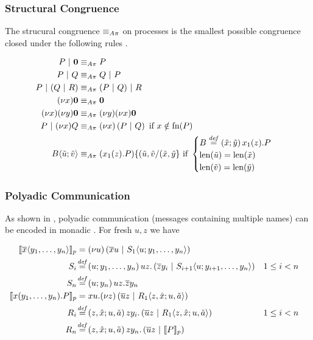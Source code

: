 \vfill

\subsubsection{Structural Congruence}

The strucural congruence $\equiv_{A\pi}$ on processes
is the smallest possible congruence closed under the following rules
\cite{thati_theory_2003}.

\begin{align*}
  P \apar \anullproc
    &\astructequ P \\
  P \apar Q
    &\astructequ Q \apar P \\
  P \apar (Q \apar R)
    &\astructequ (P \apar Q) \apar R \\
  \anew{x}{\anullproc}
    &\astructequ \anullproc \\
  \anew{x}{\anew{y}{\anullproc}}
    &\astructequ \anew{y}{\anew{x}{\anullproc}} \\
  P \apar \anew{x}{Q}
    &\astructequ \anew*{x}{P \apar Q} \text{ if } x \notin \fn{P} \\
  \ains{B}{\tilde{u}}{\tilde{v}}
    &\astructequ (\arcv{x_1}{z} . P)\substitution{\subst{(\tilde{u},\tilde{v}}{(\tilde{x},\tilde{y}}}
    \text{ if }
    \begin{cases}
      \adef{B}{\tilde{x}}{\tilde{y}}{\arcv{x_1}{z} . P}\\
      \operatorname{len}(\tilde{u}) = \operatorname{len}(\tilde{x})\\
      \operatorname{len}(\tilde{v}) = \operatorname{len}(\tilde{y})
    \end{cases}
\end{align*}


\subsubsection{Polyadic Communication}

As shown in \cite{agha_algebraic_2004},
polyadic communication (messages containing multiple names)
can be encoded in monadic \actorpicalc.
For fresh $u, z$ we have

\begin{align*}
  \encPolyAP{\asnd{x}{y_1, \ldots, y_n}}
  &= \anew*{u}{\amsnd{x}{u} \apar \ains{S_1}{u}{y_1, \ldots, y_n}}
  \\
  \adef*{S_i}{u}{y_1, \ldots, y_n}
    {\amrcv{u}{z} . \parens{\amsnd{z}{y_i} \apar \ains{S_{i+1}}{u}{y_{i+1}, \ldots, y_n}}}
    && 1 \leq i < n
  \\
  \adef*{S_n}{u}{y_n}{\amrcv{u}{z} . \amsnd{z}{y_n}}
  \\
  \encPolyAP{\arcv{x}{y_1, \ldots, y_n} . P}
  &= \amrcv{x}{u} . \anew*{z}{\amsnd{u}{z} \apar \ains{R_1}{z,\hat{x}}{u,\tilde{a}}}
  \\
  \adef*{R_i}{z,\hat{x}}{u,\tilde{a}}
    {\amrcv{z}{y_i} . \parens{\amsnd{u}{z} \apar \ains{R_1}{z,\hat{x}}{u,\tilde{a}}}}
    && 1 \leq i < n
  \\
  \adef*{R_n}{z,\hat{x}}{u,\tilde{a}}
    {\amrcv{z}{y_n} . \parens{\amsnd{u}{z} \apar \encPolyAP{P}}}
\end{align*}

